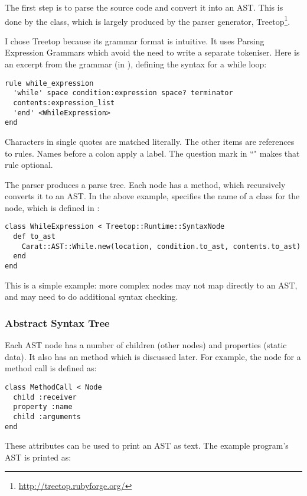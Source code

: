 The first step is to parse the source code and convert it into an AST. This is done by the  class, which is largely produced by the parser generator, Treetop\footnote{\url{http://treetop.rubyforge.org/}}.

I chose Treetop because its grammar format is intuitive. It uses Parsing Expression Grammars which avoid the need to write a separate tokeniser. Here is an excerpt from the grammar (in ), defining the syntax for a while loop:

\begin{lstlisting}[language=treetop]
rule while_expression
  'while' space condition:expression space? terminator
  contents:expression_list
  'end' <WhileExpression>
end
\end{lstlisting}

Characters in single quotes are matched literally. The other items are references to rules. Names before a colon apply a label. The question mark in ``" makes that rule optional.

The parser produces a parse tree. Each node has a  method, which recursively converts it to an AST. In the above example,  specifies the name of a class for the node, which is defined in :

\begin{lstlisting}
class WhileExpression < Treetop::Runtime::SyntaxNode
  def to_ast
    Carat::AST::While.new(location, condition.to_ast, contents.to_ast)
  end
end
\end{lstlisting}

This is a simple example: more complex nodes may not map directly to an AST, and may need to do additional syntax checking.

\subsubsection{Abstract Syntax Tree}

Each AST node has a number of children (other nodes) and properties (static data). It also has an  method which is discussed later. For example, the node for a method call is defined as:

\begin{lstlisting}
class MethodCall < Node
  child :receiver
  property :name
  child :arguments
end
\end{lstlisting}

These attributes can be used to print an AST as text. The example program's AST is printed as:

